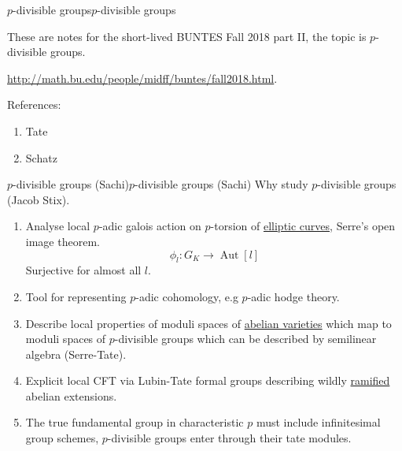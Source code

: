\documentclass[10pt,]{book}
\numberwithin{equation}{section}
\newcommand{\lb}{[}
\newcommand{\rb}{]}
\DeclareMathOperator{\Aut}{Aut}
\begin{document}
\begin{chapterptx}{\(p\)-divisible groups}{}{\(p\)-divisible groups}{}{}\label{chapter-p-div}
\begin{introduction}{}%
\hypertarget{p-984}{}%
These are notes for the short-lived BUNTES Fall 2018 part II, the topic is \(p\)-divisible groups.%
\par
\hypertarget{p-985}{}%
\url{http://math.bu.edu/people/midff/buntes/fall2018.html}.%
\par
\hypertarget{p-986}{}%
References:\leavevmode%
\begin{enumerate}
\item\hypertarget{li-249}{}Tate%
\item\hypertarget{li-250}{}Schatz%
\end{enumerate}
%
\end{introduction}%
%
%
\typeout{************************************************}
\typeout{************************************************}
%
\begin{sectionptx}{\(p\)-divisible groups (Sachi)}{}{\(p\)-divisible groups (Sachi)}{}{}\label{sec-p-div-gps}
\hypertarget{p-987}{}%
Why study  \(p\)-divisible groups (Jacob Stix).\leavevmode%
\begin{enumerate}
\item\hypertarget{li-251}{}Analyse local \(p\)-adic galois action on \(p\)-torsion of \hyperref[def-supersing-isog-ec]{elliptic curves}, Serre's open image theorem.%
\begin{equation*}
\phi_l \colon G_K \to \Aut \lb l \rb
\end{equation*}
Surjective for almost all \(l\).%
\item\hypertarget{li-252}{}Tool for representing \(p\)-adic cohomology, e.g \(p\)-adic hodge theory.%
\item\hypertarget{li-253}{}Describe local properties of moduli spaces of \hyperref[def-buntes-abvar]{abelian varieties} which map to moduli spaces of \(p\)-divisible groups which can be described by semilinear algebra (Serre-Tate).%
\item\hypertarget{li-254}{}Explicit local CFT via Lubin-Tate formal groups describing wildly \hyperref[def-dess-ramified]{ramified} abelian extensions.%
\item\hypertarget{li-255}{}The true fundamental group in characteristic \(p\) must include infinitesimal group schemes, \(p\)-divisible groups enter through their tate modules.%
\end{enumerate}

\end{sectionptx}
\end{chapterptx}
\end{document}
